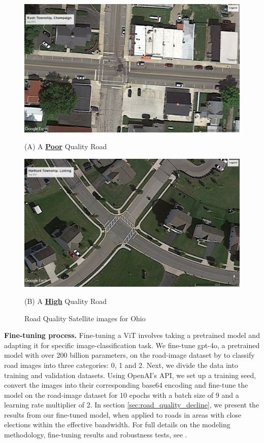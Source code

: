 \begin{figure}[ht]
    \centering
    \begin{minipage}{0.59\textwidth}
        \centering
        \includegraphics[width=\textwidth]{images/rush_twp_champaign_aug16.jpg}
        \caption*{(A) A {\bf \underline{Poor}} Quality Road}
    \end{minipage}
    \hspace{0.5in}
    \begin{minipage}{0.59\textwidth}
        \centering
        \includegraphics[width=\textwidth]{images/hartford_twp_licking_sep21.jpg}
        \caption*{(B) A {\bf \underline{High}} Quality Road}
    \end{minipage}
    \caption{Road Quality Satellite images for Ohio}
    \label{fig:road_quality_examples}
\end{figure}

{\bf Fine-tuning process.} Fine-tuning a ViT involves taking a pretrained model and adapting it for specific image-classification task. We fine-tune gpt-4o, a pretrained model with over 200 billion parameters, on the road-image dataset by \cite{brewer2021} to classify road images into three categories: 0, 1 and 2. Next, we divide the data into training and validation datasets. Using OpenAI's API, we set up a training seed, convert the images into their corresponding base64 encoding and fine-tune the model on the road-image dataset for 10 epochs with a batch size of 9 and a learning rate multiplier of 2. In section \ref{sec:road_quality_decline}, we present the results from our fine-tuned model, when applied to roads in areas with close elections within the effective bandwidth. For full details on the modeling methodology, fine-tuning results and robustness tests, see \cite{2025predicting}. 

